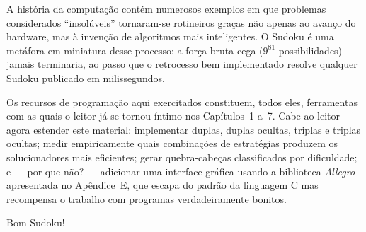 \documentclass[11pt,a4paper,oneside]{report}
\begin{document}
\begin{engenharia}
A história da computação contém numerosos exemplos em que problemas
considerados ``insolúveis'' tornaram-se rotineiros graças não apenas
ao avanço do hardware, mas à invenção de algoritmos mais inteligentes.
O Sudoku é uma metáfora em miniatura desse processo: a força bruta
cega ($9^{81}$ possibilidades) jamais terminaria, ao passo que o
retrocesso bem implementado resolve qualquer Sudoku publicado em
milissegundos.
\end{engenharia}

Os recursos de programação aqui exercitados constituem, todos eles,
ferramentas com as quais o leitor já se tornou íntimo nos Capítulos~1
a~7. Cabe ao leitor agora estender este material: implementar duplas,
duplas ocultas, triplas e triplas ocultas; medir empiricamente quais
combinações de estratégias produzem os solucionadores mais eficientes;
gerar quebra-cabeças classificados por dificuldade; e --- por que não? ---
adicionar uma interface gráfica usando a biblioteca \textit{Allegro}
apresentada no Apêndice~E, que escapa do padrão da linguagem C mas
recompensa o trabalho com programas verdadeiramente bonitos.

Bom Sudoku!
\end{document}
